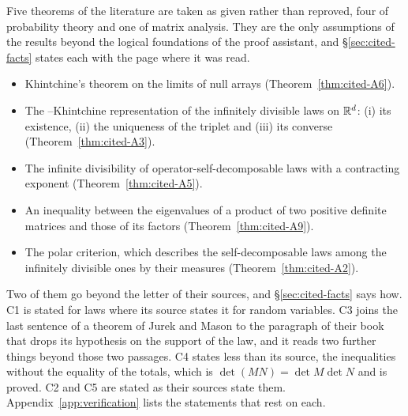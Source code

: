 Five theorems of the literature are taken as given rather than
reproved, four of probability theory and one of matrix analysis. They are the only assumptions of
the results beyond the logical foundations of the proof assistant, and
\S\ref{sec:cited-facts} states each with the page where it was read.
\begin{itemize}
\item[\ledger{A6}] Khintchine's theorem on the limits of null arrays (Theorem~\ref{thm:cited-A6}).
\item[\ledger{A3}] The \Levy--Khintchine representation of the infinitely divisible laws on $\mathbb{R}^d$:
(i) its existence, (ii) the uniqueness of the triplet and (iii) its converse
(Theorem~\ref{thm:cited-A3}).
\item[\ledger{A5}] The infinite divisibility of operator-self-decomposable laws with a contracting
exponent (Theorem~\ref{thm:cited-A5}).
\item[\ledger{A9}] An inequality between the eigenvalues of a product of two positive definite
matrices and those of its factors (Theorem~\ref{thm:cited-A9}).
\item[\ledger{A2}] The polar criterion, which describes the self-decomposable laws among the
infinitely divisible ones by their \Levy{} measures (Theorem~\ref{thm:cited-A2}).
\end{itemize}
Two of them go beyond the letter of their sources, and \S\ref{sec:cited-facts} says how. C1 is
stated for laws where its source states it for random variables. C3 joins the last sentence of a
theorem of Jurek and Mason to the paragraph of their book that drops its hypothesis on the support of
the law, and it reads two further things beyond those two passages. C4 states less than its source,
the inequalities without the equality of the totals, which is $\det(MN) = \det M\det N$ and is
proved. C2 and C5 are stated as their sources state them. Appendix~\ref{app:verification} lists the statements that rest on
each.

